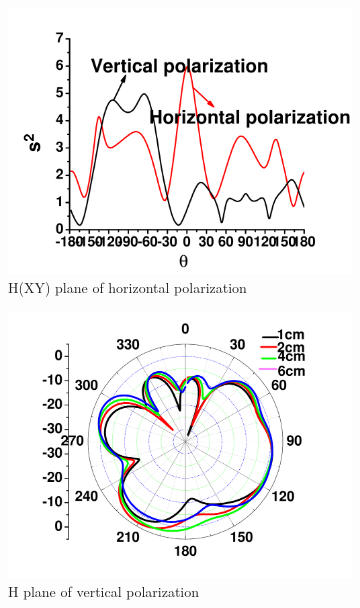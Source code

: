 \documentclass[journal]{IEEEtran}
\begin{document}
\begin{figure}[!htb]
\begin{subfigure}[b]{0.24\textwidth}
\includegraphics[width=\textwidth]{figs/6e.pdf}
\caption{H(XY) plane of horizontal polarization}
\label{fig:6d}	
\end{subfigure}
\begin{subfigure}[b]{0.24\textwidth}
\includegraphics[width=\textwidth]{figs/6d.pdf}
\caption{H plane of vertical polarization}
\label{fig:6e}	
\end{subfigure}
\begin{subfigure}[b]{0.24\textwidth}

\end{subfigure}
\end{figure}
\end{document}
